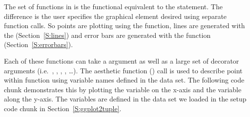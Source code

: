 \documentclass[nojss]{jss}\usepackage[]{graphicx}\usepackage[]{color}
\begin{document}
The  set of functions in  is the functional equivalent to the  statement. The difference is the user specifies the graphical element desired using separate function calls. So points are plotting using the  function, lines are generated with the  (Section~\ref{S:lines}) and error bars are generated with the  function (Section~\ref{S:errorbars}).

Each of these functions can take a  argument as well as a large set of decorator arguments (i.e.\ , , , , \ldots). The aesthetic function () call is used to describe point within   function using variable names defined in the data set. The following code chunk demonstrates this by plotting the  variable on the x-axis and the  variable along the y-axis. The variables are defined in the  data set we loaded in the setup code chunk in Section~\ref{S:ggplot2tuple}.
\end{document}
